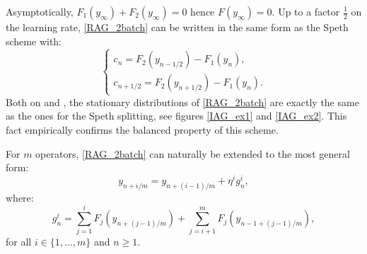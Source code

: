 \documentclass[article,authoryear,jmlmc]{beg_32}             %
\begin{document}
Asymptotically, $F_1(y_{\infty})+F_2(y_{\infty})=0$ hence $F(y_{\infty})=0$.
Up to a factor $\frac{1}{2}$ on the learning rate, 
\eqref{RAG_2batch} can be written in the same form as the Speth scheme with:
\begin{equation*}
	\left\{
	\begin{array}{ll}
		c_n = F_2(y_{n-1/2})-F_1(y_n),\\
		c_{n+1/2} = F_2(y_{n+1/2})-F_1(y_n).
	\end{array}
	\right.
\end{equation*}
Both on \exOne and \exTwo, the stationary distributions of \eqref{RAG_2batch} are exactly the same as the ones for the Speth splitting, see figures \ref{IAG_ex1} and \ref{IAG_ex2}. This fact empirically confirms the balanced property of this scheme.

For $m$ operators, \eqref{RAG_2batch} can naturally be extended to the most general form:
\begin{equation}
	y_{n+i/m} = y_{n+(i-1)/m}+\eta^i g_n^i,
	\label{RAG_scheme}
\end{equation}
where:
\begin{equation}
	g_n^i = \sum_{j=1}^i F_j\left(y_{n+(j-1)/m}\right)+\sum_{j=i+1}^m F_j\left(y_{n-1+(j-1)/m}\right),
	\label{gni}
\end{equation}
for all $i \in \{1,\dots,m\}$ and $n\geq 1$. 
\end{document}
